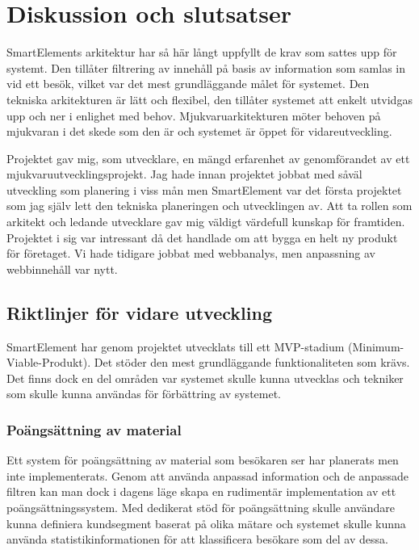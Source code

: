 \section{Diskussion och slutsatser}

SmartElements arkitektur har så här långt uppfyllt de krav som sattes upp för systemt. Den tillåter filtrering av innehåll på basis av information som samlas in vid ett besök, vilket var det mest grundläggande målet för systemet. Den tekniska arkitekturen är lätt och flexibel, den tillåter systemet att enkelt utvidgas upp och ner i enlighet med behov. Mjukvaruarkitekturen möter behoven på mjukvaran i det skede som den är och systemet är öppet för vidareutveckling.

Projektet gav mig, som utvecklare, en mängd erfarenhet av genomförandet av ett mjukvaruutvecklingsprojekt. Jag hade innan projektet jobbat med såväl utveckling som planering i viss mån men SmartElement var det första projektet som jag själv lett den tekniska planeringen och utvecklingen av. Att ta rollen som arkitekt och ledande utvecklare gav mig väldigt värdefull kunskap för framtiden. Projektet i sig var intressant då det handlade om att bygga en helt ny produkt för företaget. Vi hade tidigare jobbat med webbanalys, men anpassning av webbinnehåll var nytt.

\subsection{Riktlinjer för vidare utveckling}

SmartElement har genom projektet utvecklats till ett MVP-stadium (Minimum-Viable-Produkt). Det stöder den mest grundläggande funktionaliteten som krävs. Det finns dock en del områden var systemet skulle kunna utvecklas och tekniker som skulle kunna användas för förbättring av systemet.

\subsubsection{Poängsättning av material}

Ett system för poängsättning av material som besökaren ser har planerats men inte implementerats. Genom att använda anpassad information och de anpassade filtren kan man dock i dagens läge skapa en rudimentär implementation av ett poängsättningssystem. Med dedikerat stöd för poängsättning skulle användare kunna definiera kundsegment baserat på olika mätare och systemet skulle kunna använda statistikinformationen för att klassificera besökare som del av dessa.

